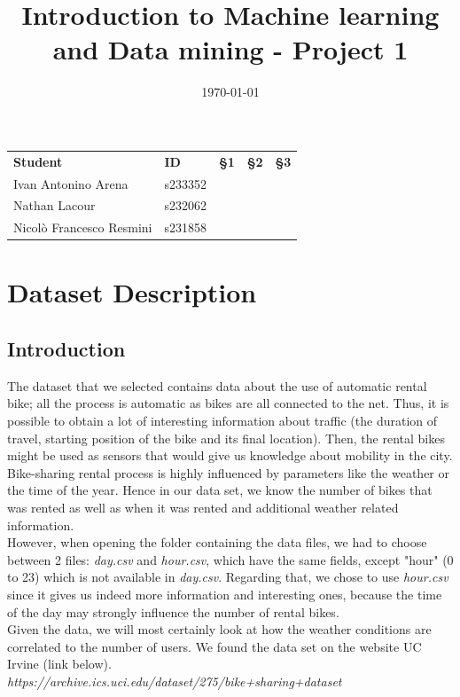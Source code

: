 \documentclass[11pt,a4paper]{article}
\begin{document}
 

\title{Introduction to Machine learning and Data mining - Project 1} %

 
\date{\today}

\maketitle
\begin{table}
\centering
\begin{tabular}{lllll}
 \textbf{Student} & \textbf{ID} & \textbf{§1} & \textbf{§2} & \textbf{§3} \\
 Ivan Antonino Arena & s233352 &  &  &  \\
 Nathan Lacour & s232062 &  &  &  \\
 Nicolò Francesco Resmini & s231858 &  &  & 
\end{tabular}
\end{table}



\pagebreak

\section{Dataset Description}

\subsection{Introduction}
The dataset that we selected contains data about the use of automatic rental bike; all the process is automatic as bikes are all connected to the net. Thus, it is possible to obtain a lot of interesting information about traffic (the duration of travel, starting position of the bike and its final location). Then, the rental bikes might be used as sensors that would give us knowledge about mobility in the city. \\ 
Bike-sharing rental process is highly influenced by parameters like the weather or the time of the year.
Hence in our data set, we know the number of bikes that was rented as well as when it was rented and additional weather related information.\\
However, when opening the folder containing the data files, we had to choose between 2 files: \textit{day.csv} and \textit{hour.csv}, which have the same fields, except "hour" (0 to 23) which is not available in \textit{day.csv}. Regarding that, we chose to use \textit{hour.csv} since it gives us indeed more information and interesting ones, because the time of the day may strongly influence the number of rental bikes.\\
Given the data, we will most certainly look at how the weather conditions are correlated to the number of users.
We found the data set on the website UC Irvine (link below).\\
\textit{https://archive.ics.uci.edu/dataset/275/bike+sharing+dataset}
\end{document}
